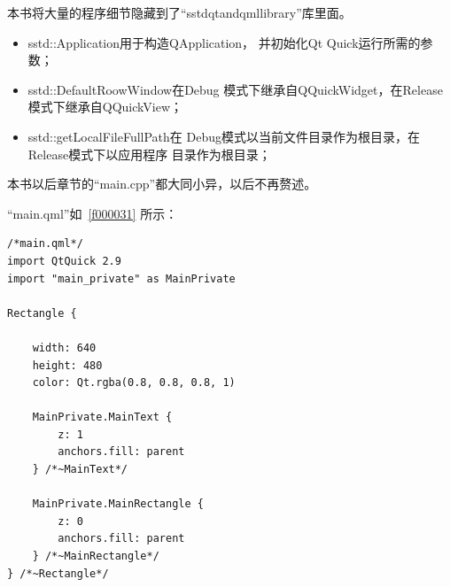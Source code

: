 本书将大量的程序细节隐藏到了“sstd\underline{\hspace{0.5em}}qt\underline{\hspace{0.5em}}and\underline{\hspace{0.5em}}qml\underline{\hspace{0.5em}}library”库里面。

\begin{itemize}
\item sstd::Application用于构造QApplication，
并初始化Qt Quick运行所需的参数；
\item sstd::DefaultRoowWindow在Debug
模式下继承自QQuickWidget，在Release模式下继承自QQuickView；
\item sstd::getLocalFileFullPath在
Debug模式以当前文件目录作为根目录，在Release模式下以应用程序
目录作为根目录；
\end{itemize}

本书以后章节的“main.cpp”都大同小异，以后不再赘述。


“main.qml”如\lstlistingname\ \ref{f000031}
所示：

\FloatBarrier
\begin{lstlisting}[label=f000031,
caption=GoodLuck,
title=\lstlistingname\ \thelstlisting
]
/*main.qml*/
import QtQuick 2.9
import "main_private" as MainPrivate

Rectangle {

    width: 640
    height: 480
    color: Qt.rgba(0.8, 0.8, 0.8, 1)

    MainPrivate.MainText {
        z: 1
        anchors.fill: parent
    } /*~MainText*/

    MainPrivate.MainRectangle {
        z: 0
        anchors.fill: parent
    } /*~MainRectangle*/
} /*~Rectangle*/
\end{lstlisting}          %

